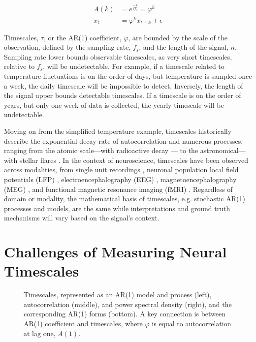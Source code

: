 \documentclass[pdflatex,sn-mathphys-num]{sn-jnl}
\begin{document}
\begin{align}
A(k) &= e^{\frac{-k}{\tau f_s}} = \varphi^k \label{eq:acf} \\
x_t &= \varphi^k x_{t-k} + \epsilon \label{eq:ar}
\end{align}

Timescales, $\tau$, or the AR(1) coefficient, $\varphi$, are bounded by the scale of the observation, defined by the sampling rate, $f_s$, and the length of the signal, $n$. Sampling rate lower bounds observable timescales, as very short timescales, relative to $f_s$, will be undetectable. For example, if a timescale related to temperature fluctuations is on the order of days, but temperature is sampled once a week, the daily timescale will be impossible to detect. Inversely, the length of the signal upper bounds detectable timescales. If a timescale is on the order of years, but only one week of data is collected, the yearly timescale will be undetectable.

Moving on from the simplified temperature example, timescales historically describe the exponential decay rate of autocorrelation and numerous processes, ranging from the atomic scale—with radioactive decay \cite{semkow_oscillations_2009} — to the astronomical—with stellar flares \cite{anfinogentov_decaying_2013}. In the context of neuroscience, timescales have been observed across modalities, from single unit recordings \cite{murray_hierarchy_2014}, neuronal population local field potentials (LFP) \cite{haider_millisecond_2016}, electroencephalography (EEG) \cite{meisel_decline_2017}, magnetoencephalography (MEG) \cite{zhigalov_relationship_2015}, and functional magnetic resonance imaging (fMRI) \cite{watanabe_atypical_2019}. Regardless of domain or modality, the mathematical basis of timescales, e.g. stochastic AR(1) processes and models, are the same while interpretations and ground truth mechanisms will vary based on the signal's context.

\section{Challenges of Measuring Neural Timescales}



\begin{figure}[htbp]
  \centering
  
  \caption{Timescales, represented as an AR(1) model and process (left), autocorrelation (middle), and power spectral density (right), and the corresponding AR(1) forms (bottom). A key connection is between AR(1) coefficient and timescales, where $\varphi$ is equal to autocorrelation at lag one, $A(1)$.}
\end{figure}
\end{document}
